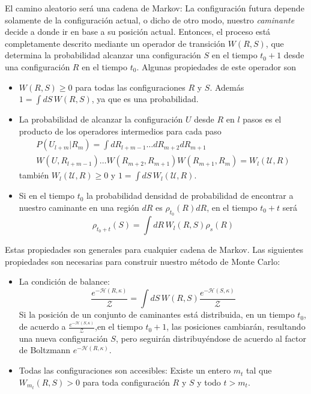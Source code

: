 El camino aleatorio será una cadena de Markov: La configuración futura
depende solamente de la configuración actual, o dicho de otro modo, nuestro
\textit{caminante} decide a donde ir en base a su posición actual. Entonces,
el proceso está completamente descrito mediante un operador 
de transición $W(R,S)$, que determina la probabilidad
alcanzar una configuración $S$ en el tiempo $t_0+1$ desde una
configuración $R$ en el tiempo $t_0$. Algunas propiedades de este
operador son 
\begin{itemize}
\item $W(R,S)\geq 0$ para todas las configuraciones
  $R$ y $S$. Además $1=\int
  dS\,W(R,S) $, ya que es una probabilidad.
\item La probabilidad de alcanzar la configuración $U$ desde
  $R$ en $l$ pasos es el producto de los operadores intermedios para cada paso 
  \begin{multline}
    P(U_{l+m}|R_m)=\int
  dR_{l+m-1}\dots dR_{m+2}
  dR_{m+1}\\W(U,R_{l+m-1})\dots
  W(R_{m+2},R_{m+1}) W(R_{m+1},R_{m})=W_l(\mathcal{U},R)
  \end{multline}
  también $W_l(\mathcal{U},R) \geq 0$ y $1=\int
  dS\, W_l(\mathcal{U},R)$.
\item Si en el tiempo $t_0$ la probabilidad densidad de probabilidad de
  encontrar a nuestro caminante en una región $dR$ es $\rho_{t_0}(R)dR$, en el tiempo $t_0+t$ será
\begin{equation}
\rho_{t_0+t}(S)=\int
  dR\, W_l(R,S)\rho_s(R)
\end{equation}
\end{itemize}
Estas propiedades son generales para cualquier cadena de Markov. Las
siguientes propiedades son necesarias para construir nuestro método de Monte
Carlo:
\begin{itemize}
\item La condición de balance:
  \begin{equation}\label{ecuacion_balance}
    \frac{e^{-\mathcal{H}(R,\kappa)}}{\mathcal{Z}}=\int
    dS\, W(R,S)\frac{e^{-\mathcal{H}(S,\kappa)}}{\mathcal{Z}}
  \end{equation}
  Si la posición de un conjunto de caminantes está distribuida, en un tiempo
  $t_0$, de acuerdo a $\frac{e^{-\mathcal{H}(S,\kappa)}}{\mathcal{Z}}$,en el
  tiempo $t_0+1$, las posiciones cambiarán, resultando una nueva configuración
  $S$, pero seguirán distribuyéndose de acuerdo al factor de Boltzmann $e^{-\mathcal{H}(R,\kappa)}$.
\item Todas las configuraciones son accesibles: Existe un entero $m_t$ tal que
  $W_{m_t}(R,S)>0$ para toda configuración $R$ y $S$ y todo $t>m_t$. 
\end{itemize}

